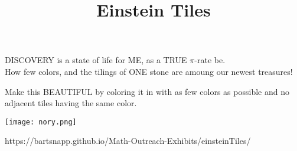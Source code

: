 \documentclass{../exhibit}
\title{Einstein Tiles}
\begin{document}
\begin{context}

  DISCOVERY is a state of life for ME,
   as a TRUE $\pi$-rate be.\\

   How few colors, and the tilings of ONE stone are amoung our newest
   treasures!
  
\end{context}

\begin{directions}
  Make this BEAUTIFUL by coloring it in with as few colors as possible
  and no adjacent tiles having the same color.
  \begin{itemize}
  \end{itemize}
\end{directions}

  \begin{example}
    \begin{center}
      \texttt{[image: nory.png]}
    \end{center}
\end{example}

\begin{mathConnections}
  https://bartsnapp.github.io/Math-Outreach-Exhibits/einsteinTiles/
\end{mathConnections}
\end{document}
